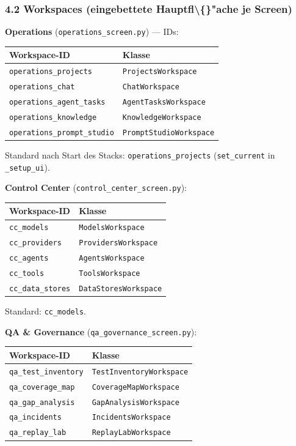 \subsubsection{4.2 Workspaces (eingebettete Hauptfl\textbackslash\{\}"ache je Screen)}

\textbf{Operations} (\texttt{operations\_screen.py}) --- IDs:

\begin{center}
\begin{tabular}{ll}
\hline
Workspace-ID & Klasse \\
\hline
\texttt{operations\_projects} & \texttt{ProjectsWorkspace} \\
\texttt{operations\_chat} & \texttt{ChatWorkspace} \\
\texttt{operations\_agent\_tasks} & \texttt{AgentTasksWorkspace} \\
\texttt{operations\_knowledge} & \texttt{KnowledgeWorkspace} \\
\texttt{operations\_prompt\_studio} & \texttt{PromptStudioWorkspace} \\
\hline
\end{tabular}
\end{center}

Standard nach Start des Stacks: \texttt{operations\_projects} (\texttt{set\_current} in \texttt{\_setup\_ui}).

\textbf{Control Center} (\texttt{control\_center\_screen.py}):

\begin{center}
\begin{tabular}{ll}
\hline
Workspace-ID & Klasse \\
\hline
\texttt{cc\_models} & \texttt{ModelsWorkspace} \\
\texttt{cc\_providers} & \texttt{ProvidersWorkspace} \\
\texttt{cc\_agents} & \texttt{AgentsWorkspace} \\
\texttt{cc\_tools} & \texttt{ToolsWorkspace} \\
\texttt{cc\_data\_stores} & \texttt{DataStoresWorkspace} \\
\hline
\end{tabular}
\end{center}

Standard: \texttt{cc\_models}.

\textbf{QA \& Governance} (\texttt{qa\_governance\_screen.py}):

\begin{center}
\begin{tabular}{ll}
\hline
Workspace-ID & Klasse \\
\hline
\texttt{qa\_test\_inventory} & \texttt{TestInventoryWorkspace} \\
\texttt{qa\_coverage\_map} & \texttt{CoverageMapWorkspace} \\
\texttt{qa\_gap\_analysis} & \texttt{GapAnalysisWorkspace} \\
\texttt{qa\_incidents} & \texttt{IncidentsWorkspace} \\
\texttt{qa\_replay\_lab} & \texttt{ReplayLabWorkspace} \\
\hline
\end{tabular}
\end{center}

